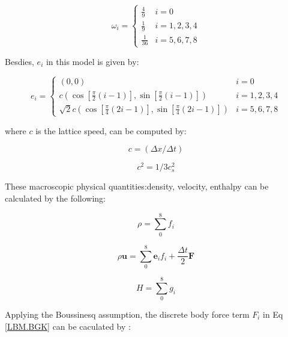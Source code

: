 \begin{equation}\label {LBM.omega-i}
\omega_{i}=\left\{\begin{array}{ll}
	\frac{4}{9} & i=0 \\
	\frac{1}{9} & i=1,2,3,4 \\
	\frac{1}{36} & i=5,6,7,8
\end{array}\right.
\end{equation}\label {LBM.omega-i}

Besdies, $e_{i}$ in this model is given by:

\begin{equation}\label {LBM.e-i}
e_{i}=\left\{\begin{array}{ll}
	(0,0) & i=0 \\
	c\left(\cos \left[\frac{\pi}{2}(i-1)\right], \sin \left[\frac{\pi}{2}(i-1)\right]\right) & i=1,2,3,4 \\
	\sqrt{2} c\left(\cos \left[\frac{\pi}{4}(2 i-1)\right], \sin \left[\frac{\pi}{4}(2 i-1)\right]\right) & i=5,6,7,8
\end{array}\right.
\end{equation}\label {LBM.e-i}

where $c$ is the lattice speed, can be computed by:

\begin{equation}\label {LBM.c}
c=(\Delta x / \Delta t)
\end{equation}\label {LBM.c}

\begin{equation}\label {LBM.cs}
c^{2}=1 / 3 c_{s}^{2}
\end{equation}\label {LBM.cs}

These macroscopic physical quantities:density, velocity, enthalpy  can be calculated by the following:

\begin{equation}\label {LBM.rho}
\rho=\sum_{0}^{8} f_{i}
\end{equation}\label {LBM.rho}

\begin{equation}\label {LBM.rho-u}
\rho \boldsymbol{u}=\sum_{0}^{8} \boldsymbol{e}_{i} f_{i}+\frac{\Delta t}{2} \boldsymbol{F}
\end{equation}\label {LBM.rho-u}

\begin{equation}\label {LBM.H}
	H=\sum_{0}^{8} g_{i}
\end{equation}\label {LBM.H}

Applying the Boussinesq assumption, the discrete body force term $F_{i}$ in Eq \ref{LBM.BGK} can be caculated by :

